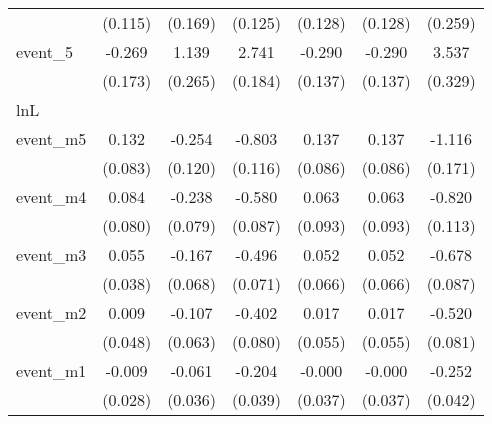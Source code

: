 {\begin{tabular}{l*{6}{c}}
            &     (0.115)         &     (0.169)         &     (0.125)         &     (0.128)         &     (0.128)         &     (0.259)         \\
[1em]
event\_5     &      -0.269         &       1.139\sym{***}&       2.741\sym{***}&      -0.290\sym{*}  &      -0.290\sym{*}  &       3.537\sym{***}\\
            &     (0.173)         &     (0.265)         &     (0.184)         &     (0.137)         &     (0.137)         &     (0.329)         \\
\hline
lnL         &                     &                     &                     &                     &                     &                     \\
event\_m5    &       0.132         &      -0.254\sym{*}  &      -0.803\sym{***}&       0.137         &       0.137         &      -1.116\sym{***}\\
            &     (0.083)         &     (0.120)         &     (0.116)         &     (0.086)         &     (0.086)         &     (0.171)         \\
[1em]
event\_m4    &       0.084         &      -0.238\sym{**} &      -0.580\sym{***}&       0.063         &       0.063         &      -0.820\sym{***}\\
            &     (0.080)         &     (0.079)         &     (0.087)         &     (0.093)         &     (0.093)         &     (0.113)         \\
[1em]
event\_m3    &       0.055         &      -0.167\sym{*}  &      -0.496\sym{***}&       0.052         &       0.052         &      -0.678\sym{***}\\
            &     (0.038)         &     (0.068)         &     (0.071)         &     (0.066)         &     (0.066)         &     (0.087)         \\
[1em]
event\_m2    &       0.009         &      -0.107         &      -0.402\sym{***}&       0.017         &       0.017         &      -0.520\sym{***}\\
            &     (0.048)         &     (0.063)         &     (0.080)         &     (0.055)         &     (0.055)         &     (0.081)         \\
[1em]
event\_m1    &      -0.009         &      -0.061         &      -0.204\sym{***}&      -0.000         &      -0.000         &      -0.252\sym{***}\\
            &     (0.028)         &     (0.036)         &     (0.039)         &     (0.037)         &     (0.037)         &     (0.042)         \\

\end{tabular}}
